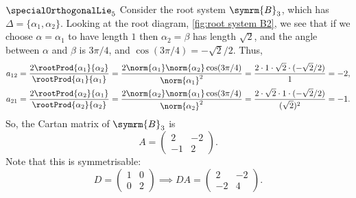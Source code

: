 \documentclass[fleqn]{NotesClass}
\newcommand{\dynkin}[2]{\symrm{#1}_{#2}}
\begin{document}
    \begin{exm}{\(\specialOrthogonalLie_5\)}{}
        Consider the root system \(\dynkin{B}{3}\), which has \(\Delta = \{\alpha_1, \alpha_2\}\).
        Looking at the root diagram, \cref{fig:root system B2}, we see that if we choose \(\alpha = \alpha_1\) to have length \(1\) then \(\alpha_2 = \beta\) has length \(\sqrt{2}\), and the angle between \(\alpha\) and \(\beta\) is \(3\pi/4\), and \(\cos(3\pi/4) = -\sqrt{2}/2\).
        Thus,
        \begin{align*}
            a_{12} &= \frac{2\rootProd{\alpha_1}{\alpha_2}}{\rootProd{\alpha_1}{\alpha_1}} = \frac{2\norm{\alpha_1}\norm{\alpha_2}\cos(3\pi/4)}{\norm{\alpha_1}^2} = \frac{2 \cdot 1 \cdot \sqrt{2} \cdot (-\sqrt{2}/2)}{1} = -2,\\
            a_{21} &= \frac{2\rootProd{\alpha_2}{\alpha_1}}{\rootProd{\alpha_2}{\alpha_2}} = \frac{2\norm{\alpha_2}\norm{\alpha_1} \cos(3\pi/4)}{\norm{\alpha_2}^2} = \frac{2 \cdot \sqrt{2} \cdot 1 \cdot (-\sqrt{2}/2)}{(\sqrt{2})^2} = -1.
        \end{align*}
        So, the Cartan matrix of \(\dynkin{B}{3}\) is
        \begin{equation}
            A =
            \begin{pmatrix}
                2 & -2\\
                -1 & 2
            \end{pmatrix}
            .
        \end{equation}
        Note that this is symmetrisable:
        \begin{equation}
            D = 
            \begin{pmatrix}
                1 & 0\\
                0 & 2
            \end{pmatrix}
            \implies DA = 
            \begin{pmatrix}
                2 & -2\\
                -2 & 4
            \end{pmatrix}
            .
        \end{equation}
        

\end{exm}
\end{document}
